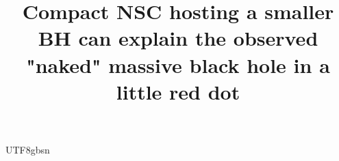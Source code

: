 \documentclass[trackchanges, twocolappendix, twocolumn]{aastex701}
\begin{document}
\begin{CJK*}{UTF8}{gbsn}

\title{Compact NSC hosting a smaller BH can explain the observed "naked" massive black hole in a little red dot}



\end{CJK*}
\end{document}
